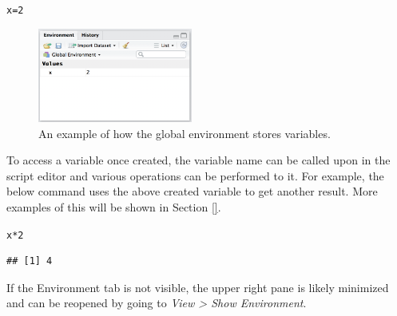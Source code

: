 \documentclass{report}\usepackage[]{graphicx}\usepackage[]{color}
\makeatletter
\newcommand{\hlnum}[1]{\textcolor[rgb]{0.686,0.059,0.569}{#1}}%
\newcommand{\hlopt}[1]{\textcolor[rgb]{0,0,0}{#1}}%
\newcommand{\hlstd}[1]{\textcolor[rgb]{0.345,0.345,0.345}{#1}}%
\newcommand{\hlkwb}[1]{\textcolor[rgb]{0.69,0.353,0.396}{#1}}%
\newenvironment{kframe}{%
 \def\at@end@of@kframe{}%
 \ifinner\ifhmode%
  \def\at@end@of@kframe{\end{minipage}}%
  \begin{minipage}{\columnwidth}%
 \fi\fi%
 \def\FrameCommand##1{\hskip\@totalleftmargin \hskip-\fboxsep
 \colorbox{shadecolor}{##1}\hskip-\fboxsep
     \hskip-\linewidth \hskip-\@totalleftmargin \hskip\columnwidth}%
 \MakeFramed {\advance\hsize-\width
   \@totalleftmargin\z@ \linewidth\hsize
   \@setminipage}}%
 {\par\unskip\endMakeFramed%
 \at@end@of@kframe}
\newenvironment{knitrout}{}{} %
\makeatother
\begin{document}
\begin{knitrout}
\color{fgcolor}\begin{kframe}
\begin{alltt}
\hlstd{x} \hlkwb{=} \hlnum{2}
\end{alltt}
\end{kframe}
\end{knitrout}

 
\begin{figure}[h!]
\centering
\includegraphics[width = 2in]{chapters/chapter_0/rstudioenv0.png}
\caption{An example of how the global environment stores variables.}
\label{fig:rstudioenv0}
\end{figure}

To access a variable once created, the variable name can be called upon in the script editor and various operations can be performed to it.  For example, the below command uses the above created variable to get another result. More examples of this will be shown in Section \ref{}.  
\begin{knitrout}
\color{fgcolor}\begin{kframe}
\begin{alltt}
\hlstd{x}\hlopt{*}\hlnum{2}
\end{alltt}
\begin{verbatim}
## [1] 4
\end{verbatim}
\end{kframe}
\end{knitrout}


If the Environment tab is not visible, the upper right pane is likely minimized and can be reopened by going to \textit{View > Show Environment}.
\end{document}
